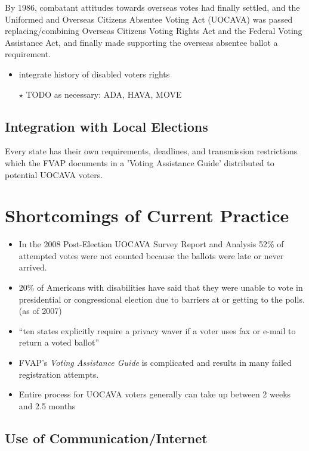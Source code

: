 By 1986, combatant attitudes towards overseas votes had finally settled, and the Uniformed and Overseas Citizens Absentee Voting Act (UOCAVA) was passed replacing/combining Overseas Citizens Voting Rights Act and the Federal Voting Assistance Act, and finally made supporting the overseas absentee ballot a requirement.

\begin{itemize}
\item integrate history of disabled voters rights
\item[$\star$] TODO as necessary: ADA, HAVA, MOVE
\end{itemize}

\subsection{Integration with Local Elections}

Every state has their own requirements, deadlines, and transmission restrictions which the FVAP documents in a 'Voting Assistance Guide' distributed to potential UOCAVA voters. 

\section{Shortcomings of Current Practice}

\begin{itemize}
\item In the 2008 Post-Election UOCAVA Survey Report and Analysis 52\% of attempted votes were not counted because the ballots were late or never arrived.
\item 20\% of Americans with disabilities have said that they were unable to vote in presidential or congressional election due to barriers at or getting to the polls. (as of 2007)
\item ``ten states explicitly require a privacy waver if a voter uses fax or e-mail to return a voted ballot''
\item FVAP's {\em Voting Assistance Guide} is complicated and results in many failed registration attempts.
\item Entire process for UOCAVA voters generally can take up between 2 weeks and 2.5 months
\end{itemize}

\subsection{Use of Communication/Internet}

